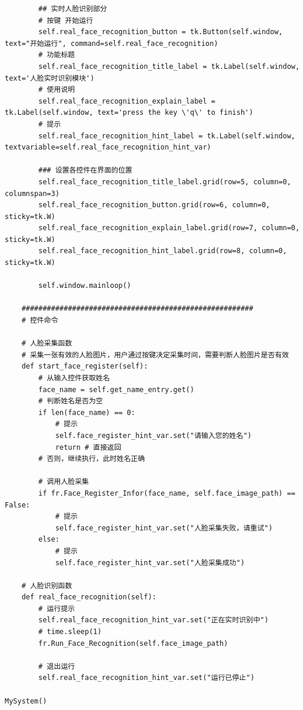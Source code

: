\documentclass[UTF8]{article}
\begin{document}
\begin{lstlisting}
        ## 实时人脸识别部分
        # 按键 开始运行
        self.real_face_recognition_button = tk.Button(self.window, text="开始运行", command=self.real_face_recognition)
        # 功能标题
        self.real_face_recognition_title_label = tk.Label(self.window, text='人脸实时识别模块')
        # 使用说明
        self.real_face_recognition_explain_label = tk.Label(self.window, text='press the key \'q\' to finish')
        # 提示
        self.real_face_recognition_hint_label = tk.Label(self.window, textvariable=self.real_face_recognition_hint_var)
        
        ### 设置各控件在界面的位置
        self.real_face_recognition_title_label.grid(row=5, column=0, columnspan=3)
        self.real_face_recognition_button.grid(row=6, column=0, sticky=tk.W)
        self.real_face_recognition_explain_label.grid(row=7, column=0, sticky=tk.W)
        self.real_face_recognition_hint_label.grid(row=8, column=0, sticky=tk.W)

        self.window.mainloop()

    #######################################################
    # 控件命令

    # 人脸采集函数
    # 采集一张有效的人脸图片，用户通过按键决定采集时间，需要判断人脸图片是否有效
    def start_face_register(self):
        # 从输入控件获取姓名
        face_name = self.get_name_entry.get()
        # 判断姓名是否为空
        if len(face_name) == 0:
            # 提示
            self.face_register_hint_var.set("请输入您的姓名")
            return # 直接返回
        # 否则，继续执行，此时姓名正确

        # 调用人脸采集
        if fr.Face_Register_Infor(face_name, self.face_image_path) == False:
            # 提示
            self.face_register_hint_var.set("人脸采集失败，请重试")
        else:
            # 提示
            self.face_register_hint_var.set("人脸采集成功")

    # 人脸识别函数
    def real_face_recognition(self):
        # 运行提示
        self.real_face_recognition_hint_var.set("正在实时识别中")
        # time.sleep(1)
        fr.Run_Face_Recognition(self.face_image_path)

        # 退出运行
        self.real_face_recognition_hint_var.set("运行已停止")

MySystem()
\end{lstlisting}
\end{document}

